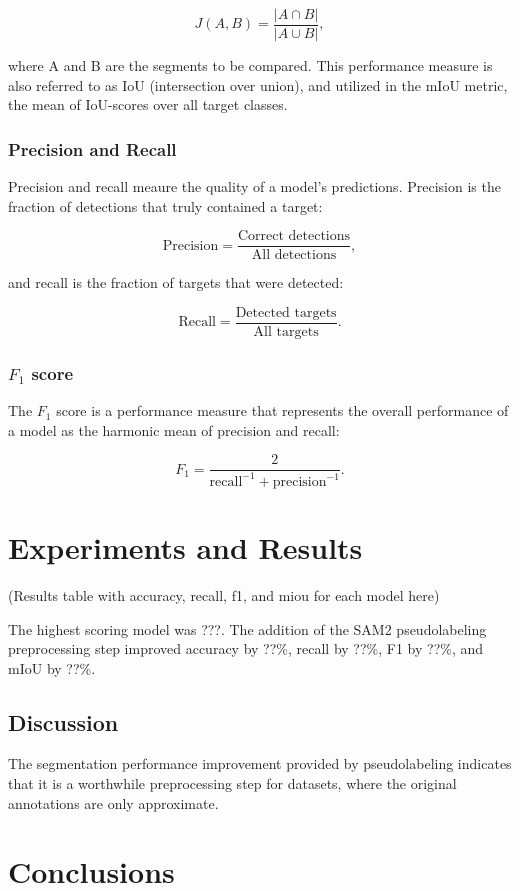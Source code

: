 \documentclass[english, 12pt, a4paper, sci, utf8, a-2b, online]{aaltothesis}
\begin{document}
\begin{equation}
J(A, B) = \frac{|A \cap B|}{|A \cup B |},
\end{equation}

where A and B are the segments to be compared. This performance measure is also referred to as IoU (intersection over union), and utilized in the mIoU metric, the mean of IoU-scores over all target classes.

\subsubsection{Precision and Recall}

Precision and recall meaure the quality of a model's predictions. Precision is the fraction of detections that truly contained a target:

\begin{equation}
    \text{Precision} = \frac{\text{Correct detections}}{\text{All detections}}, 
\end{equation}

and recall is the fraction of targets that were detected:

\begin{equation}
    \text{Recall} = \frac{\text{Detected targets}}{\text{All targets}}.
\end{equation}

\subsubsection{$F_1$ score}

The $F_1$ score is a performance measure that represents the overall performance of a model as the harmonic mean of precision and recall:

\begin{equation}
    F_1 = \frac{2}{\text{recall}^{-1} + \text{precision}^{-1}}.
\end{equation}


\section{Experiments and Results}

(Results table with accuracy, recall, f1, and miou for each model here)

The highest scoring model was ???. The addition of the SAM2 pseudolabeling preprocessing step improved accuracy by ??\%, recall by ??\%, F1 by ??\%, and mIoU by ??\%.

\subsection{Discussion}

The segmentation performance improvement provided by pseudolabeling indicates that it is a worthwhile preprocessing step for datasets, where the original annotations are only approximate.

\section{Conclusions}

\clearpage

\thesisbibliography


\end{document}
